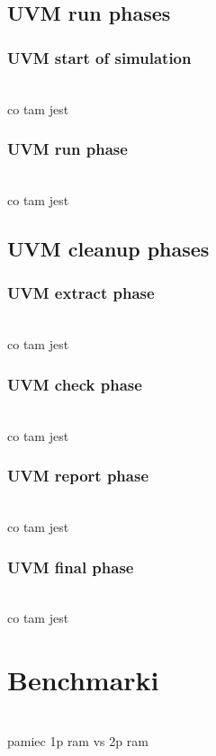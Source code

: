 \documentclass[11pt,a4paper]{article}
\begin{document}
	\subsection{UVM run phases}

		\subsubsection{UVM start of simulation}
		\hspace{5mm}
			\\co tam jest	

		\subsubsection{UVM run phase}
		\hspace{5mm}
			\\co tam jest	

	\subsection{UVM cleanup phases}

		\subsubsection{UVM extract phase}
		\hspace{5mm}
			\\co tam jest	
			
		\subsubsection{UVM check phase}
		\hspace{5mm}
			\\co tam jest	
			
		\subsubsection{UVM report phase}
		\hspace{5mm}
			\\co tam jest	
			
		\subsubsection{UVM final phase}
		\hspace{5mm}
			\\co tam jest	

\newpage
\section{Benchmarki}
\hspace{5mm}
	\\ pamiec 1p ram vs 2p ram
\end{document}
